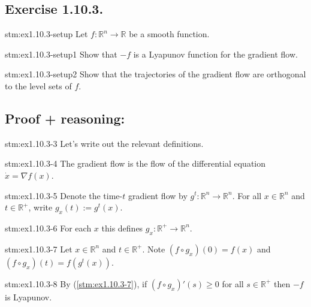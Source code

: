 \subsection*{Exercise 1.10.3.}

\begin{exercise}{stm:ex1.10.3-setup}
Let $f : \mathbb{R}^n \to \mathbb{R}$ be a smooth function. 
\end{exercise}

\begin{exercise}{stm:ex1.10.3-setup1}
Show that $-f$ is a Lyapunov function for the gradient flow.
\end{exercise}
    
\begin{exercise}{stm:ex1.10.3-setup2}
Show that the trajectories of the gradient flow are orthogonal to the level sets of $f$.
\end{exercise}

\subsection*{Proof {\color{blue} + reasoning}:}

\begin{explanation}{stm:ex1.10.3-3}
Let's write out the relevant definitions.
\end{explanation}

\begin{statement}{stm:ex1.10.3-4}
The gradient flow is the flow of the differential equation $\dot{x} = \nabla f(x)$.
\end{statement}

\begin{explanation}{stm:ex1.10.3-5}
Denote the time-$t$ gradient flow by $g^t : \mathbb{R}^n \to \mathbb{R}^n$. For all $x \in \mathbb{R}^n$ and $t \in \mathbb{R}^+$, write $g_x(t) := g^t(x)$.
\end{explanation}

\begin{explanation}{stm:ex1.10.3-6}
For each $x$ this defines $g_x : \mathbb{R}^+ \to \mathbb{R}^n$.
\end{explanation}

\begin{statement}{stm:ex1.10.3-7}
Let $x \in \mathbb{R}^n$ and $t \in \mathbb{R}^+$. Note $(f \circ g_x)(0) = f(x)$ and $(f \circ g_x)(t) = f(g^t(x))$.
\end{statement}

\begin{statement}{stm:ex1.10.3-8}
By (\ref{stm:ex1.10.3-7}), if $(f \circ g_x)'(s) \ge 0$ for all $s \in \mathbb{R}^+$ then $-f$ is Lyapunov.
\end{statement}

